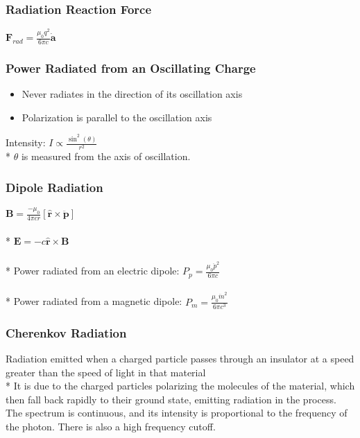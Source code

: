 \subsubsection{Radiation Reaction Force}
\(\displaystyle\mathbf{F}_{rad}=\frac{\mu_0q^2}{6\pi c}\dot{\mathbf{a}}\)

\subsubsection{Power Radiated from an Oscillating Charge}
\begin{itemize}
\item Never radiates in the direction of its oscillation axis
\item Polarization is parallel to the oscillation axis
\end{itemize}
Intensity: \(\displaystyle I\propto\frac{\sin^2(\theta)}{r^2}\)\\*
\(\theta\) is measured from the axis of oscillation.

\subsubsection{Dipole Radiation}
\(\displaystyle\mathbf{B}=\frac{-\mu_0}{4\pi cr}[\hat{\mathbf{r}}\times\ddot{\mathbf{p}}]\)\\\\*
\(\displaystyle\mathbf{E}=-c\hat{\mathbf{r}}\times\mathbf{B}\)\\\\*
Power radiated from an electric dipole: \(\displaystyle P_p=\frac{\mu_0\ddot{p}^2}{6\pi c}\)\\\\*
Power radiated from a magnetic dipole: \(\displaystyle P_m=\frac{\mu_0\ddot{m}^2}{6\pi c^3}\)

\subsubsection{Cherenkov Radiation}
Radiation emitted when a charged particle passes through an insulator at a speed greater than the speed of light in that material\\*
It is due to the charged particles polarizing the molecules of the material, which then fall back rapidly to their ground state, emitting radiation in the process.
The spectrum is continuous, and its intensity is proportional to the frequency of the photon.
There is also a high frequency cutoff.

\newpage
